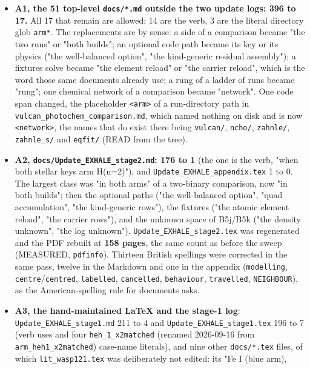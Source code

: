 \documentclass[english,a4paper]{my_memo}
\providecommand{\tightlist}{\setlength{\itemsep}{0pt}\setlength{\parskip}{0pt}}
\begin{document}
\begin{itemize}
\tightlist
\item
  \textbf{A1, the 51 top-level \texttt{docs/*.md} outside the two update logs: 396 to 17.}
  All 17 that remain are allowed: 14 are the verb, 3 are the literal directory
  glob \texttt{arm*}. The replacements are by sense: a side of a comparison became "the
  two runs" or "both builds"; an optional code path became its key or its
  physics ("the well-balanced option", "the kind-generic residual assembly");
  a fixture\textquotesingle s solve became "the element reload" or "the carrier reload", which is
  the word those same documents already use; a rung of a ladder of runs became
  "rung"; one chemical network of a comparison became "network". One code span
  changed, the placeholder \texttt{\textless{}arm\textgreater{}} of a run-directory path in
  \texttt{vulcan\_photochem\_comparison.md}, which named nothing on disk and is now
  \texttt{\textless{}network\textgreater{}}, the names that do exist there being \texttt{vulcan/}, \texttt{ncho/},
  \texttt{zahnle/}, \texttt{zahnle\_s/} and \texttt{eqfit/} (READ from the tree).
\item
  \textbf{A2, \texttt{docs/Update\_EXHALE\_stage2.md}: 176 to 1} (the one is the verb, "when both
  stellar keys arm H(n=2)"), and \texttt{Update\_EXHALE\_appendix.tex} 1 to 0. The
  largest class was "in both arms" of a two-binary comparison, now "in both
  builds"; then the optional paths ("the well-balanced option", "quad
  accumulation", "the kind-generic rows"), the fixtures ("the atomic element
  reload", "the carrier rows"), and the unknown space of B5j/B5k ("the density
  unknown", "the log unknown"). \texttt{Update\_EXHALE\_stage2.tex} was regenerated and the PDF
  rebuilt at \textbf{158 pages}, the same count as before the sweep (MEASURED,
  \texttt{pdfinfo}). Thirteen British spellings were corrected in the same pass, twelve
  in the Markdown and one in the appendix (\texttt{modelling}, \texttt{centre}/\texttt{centred},
  \texttt{labelled}, \texttt{cancelled}, \texttt{behaviour}, \texttt{travelled}, \texttt{NEIGHBOUR}), as the
  American-spelling rule for documents asks.
\item
  \textbf{A3, the hand-maintained LaTeX and the stage-1 log}: \texttt{Update\_EXHALE\_stage1.md}
  211 to 4 and \texttt{Update\_EXHALE\_stage1.tex} 196 to 7 (verb uses and four
  \texttt{heh\_1\_x2matched} (renamed 2026-09-16 from \texttt{arm\_heh1\_x2matched}) case-name literals), and nine other \texttt{docs/*.tex} files,
  of which \texttt{lit\_wasp121.tex} was deliberately not edited: its "Fe I (blue arm),

\end{itemize}
\end{document}
